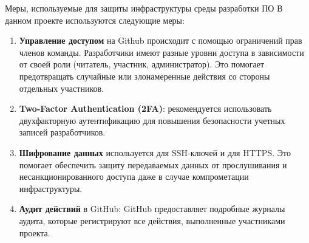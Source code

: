 \documentclass[10pt]{beamer}
\begin{document}
\begin{frame}{Меры, используемые для защиты инфраструктуры среды разработки ПО}
    В данном проекте используются следующие меры:

    \begin{enumerate}
        \item \textbf{Управление доступом} на Github происходит с помощью ограничений прав членов команды. Разработчики имеют разные уровни доступа в зависимости от своей роли (читатель, участник, администратор). Это помогает предотвращать случайные или злонамеренные действия со стороны отдельных участников.
        \item \textbf{Two-Factor Authentication (2FA)}: рекомендуется использовать двухфакторную аутентификацию для повышения безопасности учетных записей разработчиков.
        \item \textbf{Шифрование данных} используется для SSH-ключей и для HTTPS. Это помогает обеспечить защиту передаваемых данных от прослушивания и несанкционированного доступа даже в случае компрометации инфраструктуры.
        \item \textbf{Аудит действий} в GitHub: GitHub предоставляет подробные журналы аудита, которые регистрируют все действия, выполненные участниками проекта.
    \end{enumerate}
\end{frame}
\end{document}
